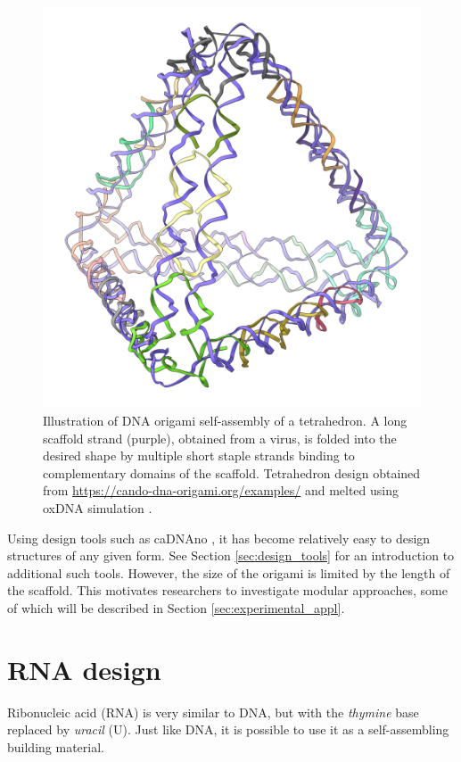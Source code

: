 \begin{figure}
    \centering\includegraphics[width=\textwidth/3]{figures/melt/assembled.png}
    \caption{Illustration of DNA origami self-assembly of a tetrahedron. A long scaffold strand (purple), obtained from a virus, is folded into the desired shape by multiple short staple strands binding to complementary domains of the scaffold. Tetrahedron design obtained from \url{https://cando-dna-origami.org/examples/} and melted using oxDNA simulation \cite{ouldridge2010dna}.
    }
    \label{fig:dnaOrigami}
\end{figure}

Using design tools such as caDNAno \cite{cadnano}, it has become relatively easy to design structures of any given form. See Section \ref{sec:design_tools} for an introduction to additional such tools. However, the size of the origami is limited by the length of the scaffold. This motivates researchers to investigate modular approaches, some of which will be described in Section \ref{sec:experimental_appl}.

\section{RNA design}
\label{sec:RNA_design}
Ribonucleic acid (RNA) is very similar to DNA, but with the \emph{thymine} base replaced by \emph{uracil} (U). Just like DNA, it is possible to use it as a self-assembling building material.

